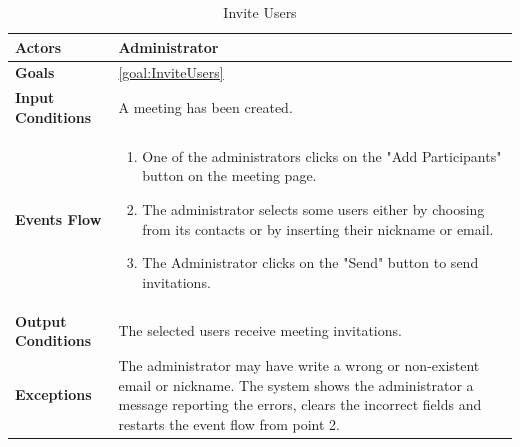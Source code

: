 \begin{table}[H]
	\centering
	\def\arraystretch{1.5}
	\begin{tabular}{|m{7cm}|m{7cm}|}
		\hline
		\textbf{Actors}            & Administrator    \\ \hline
		\textbf{Goals}             & \ref{goal:InviteUsers}           \\ \hline
		\textbf{Input Conditions}  & A meeting has been created.           \\ \hline
		\textbf{Events Flow}       &  
		\begin{enumerate}[topsep=0pt, leftmargin=*]
			\item One of the administrators clicks on the "Add Participants" button on the meeting page.
			\item The administrator selects some users either by choosing from its contacts or by inserting their nickname or email.
			\item The Administrator clicks on the "Send" button to send invitations.
		\end{enumerate}           \\ \hline
		\textbf{Output Conditions} & The selected users receive meeting invitations.            \\ \hline
		\textbf{Exceptions}        & 
		The administrator may have write a wrong or non-existent email or nickname. The system shows the administrator a message reporting the errors, clears the incorrect fields and restarts the event flow from point 2.     \\ \hline
	\end{tabular}
	\caption{Invite Users\label{UseCaseDescr:InviteUsers}}
\end{table}

